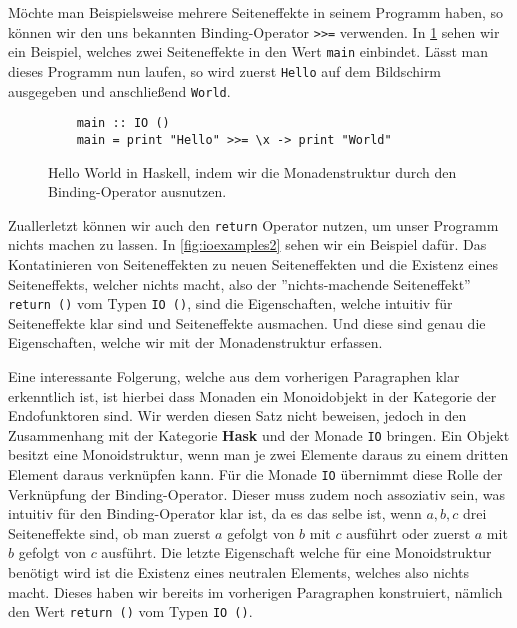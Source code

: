 \documentclass{hhuarticle}
\theoremstyle{definition}
\theoremstyle{theorem}
\begin{document}
  Möchte man Beispielsweise mehrere Seiteneffekte in seinem Programm
  haben, so können wir den uns bekannten Binding-Operator \verb|>>=|
  verwenden. In \cref{fig:ioexamples} sehen wir ein Beispiel, welches zwei
  Seiteneffekte in den Wert \verb|main| einbindet. Lässt man dieses
  Programm nun laufen, so wird zuerst \verb|Hello| auf dem Bildschirm
  ausgegeben und anschließend \verb|World|.
  
  \begin{figure}[h]
    \begin{verbatim}
    main :: IO ()
    main = print "Hello" >>= \x -> print "World"
    \end{verbatim}
    \caption{Hello World in Haskell, indem wir die Monadenstruktur durch den Binding-Operator ausnutzen.}%
    \label{fig:ioexamples}
  \end{figure}

  Zuallerletzt können wir auch den \verb|return| Operator nutzen, um
  unser Programm nichts machen zu lassen. In \cref{fig:ioexamples2} sehen
  wir ein Beispiel dafür. Das Kontatinieren von Seiteneffekten 
  zu neuen Seiteneffekten und die Existenz eines Seiteneffekts,
  welcher nichts macht, also der ''nichts-machende Seiteneffekt'' \verb|return ()|
  vom Typen \verb|IO ()|, sind die Eigenschaften, welche
  intuitiv für Seiteneffekte klar sind und Seiteneffekte ausmachen.
  Und diese sind genau die Eigenschaften, welche wir mit der Monadenstruktur
  erfassen.

  Eine interessante Folgerung, welche aus dem vorherigen Paragraphen
  klar erkenntlich ist, ist hierbei dass Monaden ein Monoidobjekt
  in der Kategorie der Endofunktoren sind. Wir werden diesen Satz nicht
  beweisen, jedoch in den Zusammenhang mit der Kategorie \textbf{Hask}
  und der Monade \verb|IO| bringen.
  Ein Objekt besitzt eine Monoidstruktur,
  wenn man je zwei Elemente daraus zu einem dritten Element daraus
  verknüpfen kann.
  Für die Monade \verb|IO| übernimmt diese Rolle der Verknüpfung der Binding-Operator.
  Dieser muss zudem noch assoziativ sein, was intuitiv für den Binding-Operator
  klar ist, da es das selbe ist, wenn $a, b, c$ drei Seiteneffekte sind,
  ob man zuerst $a$ gefolgt von $b$ mit $c$ ausführt oder zuerst $a$ mit $b$
  gefolgt von $c$ ausführt. Die letzte Eigenschaft welche für eine Monoidstruktur
  benötigt wird ist die Existenz eines neutralen Elements, welches
  also nichts macht. Dieses haben wir bereits im vorherigen Paragraphen
  konstruiert, nämlich den Wert \verb|return ()| vom Typen \verb|IO ()|.
\end{document}
